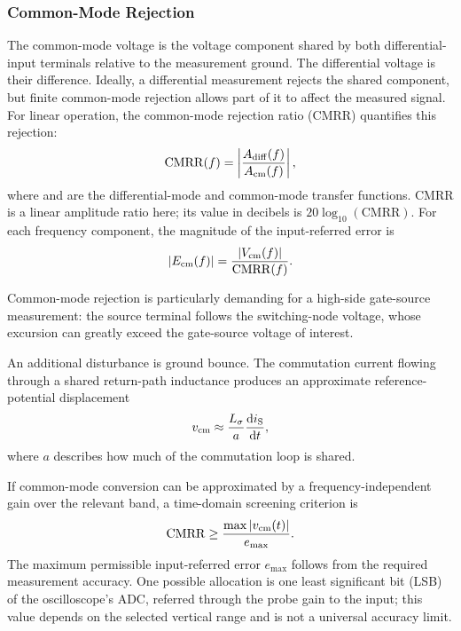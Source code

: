 \subsubsection*{Common-Mode Rejection}
The common-mode voltage  is the voltage component shared by both differential-input terminals relative to the measurement ground. 
The differential voltage is their difference. Ideally, a differential measurement rejects the shared component, but finite common-mode rejection allows part of it to affect the measured signal.
For linear operation, the common-mode rejection ratio (CMRR) quantifies this rejection:
\begin{equation}
    \mathrm{CMRR}(f) = \left|\frac{{A}_{\mathrm{diff}}(f)}{{A}_{\mathrm{cm}}(f)}\right|,
\end{equation}
where  and  are the differential-mode and common-mode transfer functions.
CMRR is a linear amplitude ratio here; its value in decibels is $20\log_{10}(\mathrm{CMRR})$.
For each frequency component, the magnitude of the input-referred error is
\begin{equation}
    |{E}_{\mathrm{cm}}(f)| = \frac{|{V}_{\mathrm{cm}}(f)|}{\mathrm{CMRR}(f)}.
\end{equation}

Common-mode rejection is particularly demanding for a high-side gate-source measurement: the source terminal follows the switching-node voltage, whose excursion can greatly exceed the gate-source voltage of interest.

An additional disturbance is ground bounce.
The commutation current  flowing through a shared return-path inductance produces an approximate reference-potential displacement
\begin{equation}
    {v}_{\mathrm{cm}} \approx \frac{{L}_{\mathrm{\sigma}}}{a}\frac{\textnormal{d}{i}_{\mathrm{S}}}{\textnormal{d}t},
\end{equation}
where $a$ describes how much of the commutation loop is shared.

If common-mode conversion can be approximated by a frequency-independent gain over the relevant band, a time-domain screening criterion is
\begin{equation}
    \mathrm{CMRR} \geq \frac{\max \left|{v}_{\mathrm{cm}}(t)\right|}{e_{\max}}.
\end{equation}
The maximum permissible input-referred error $e_{\max}$ follows from the required measurement accuracy.
One possible allocation is one least significant bit (LSB) of the oscilloscope's ADC, referred through the probe gain to the input; this value depends on the selected vertical range and is not a universal accuracy limit.

